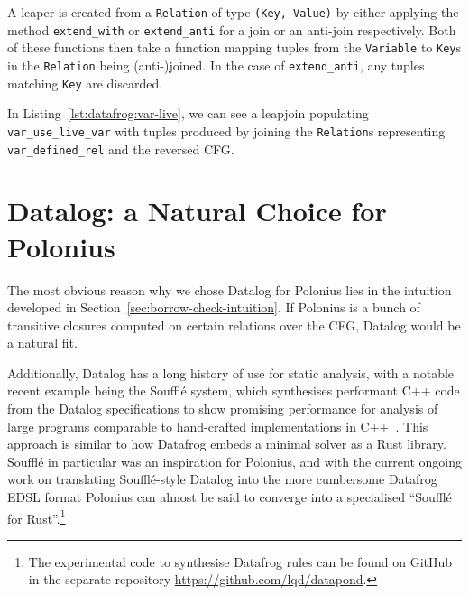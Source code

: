 \documentclass[11pt,a4paper,twoside,openany,draft]{report}
\newcommand{\InRust}[1]{\texttt{#1}}
\begin{document}
A leaper is created from a \InRust{Relation} of type \InRust{(Key, Value)} by
either applying the method \InRust{extend_with} or \InRust{extend_anti} for a
join or an anti-join respectively. Both of these functions then take a function
mapping tuples from the \InRust{Variable} to \InRust{Key}s in the
\InRust{Relation} being (anti-)joined. In the case of \InRust{extend_anti}, any
tuples matching \InRust{Key} are discarded.

In Listing~\ref{lst:datafrog:var-live}, we can see a leapjoin populating
\InRust{var_use_live_var} with tuples produced by joining the \InRust{Relation}s
representing \InRust{var_defined_rel} and the reversed CFG\@.

\section{Datalog: a Natural Choice for Polonius}\label{sec:why-datalog}

The most obvious reason why we chose Datalog for Polonius lies in the intuition
developed in Section~\ref{sec:borrow-check-intuition}. If Polonius is a bunch of
transitive closures computed on certain relations over the CFG, Datalog would be
a natural fit.

Additionally, Datalog has a long history of use for static analysis, with a
notable recent example being the Souffl{\'e} system, which synthesises
performant C++ code from the Datalog specifications to show promising
performance for analysis of large programs comparable to hand-crafted
implementations in C++~\cite{scholz_fast_2016}. This approach is similar to how
Datafrog embeds a minimal solver as a Rust library. Souffl{\'e} in particular
was an inspiration for Polonius, and with the current ongoing work on
translating Souffl{\'e}-style Datalog into the more cumbersome Datafrog EDSL
format Polonius can almost be said to converge into a specialised ``Souffl{\'e}
for Rust''.\footnote{The experimental code to synthesise Datafrog rules can be
  found on GitHub in the separate repository
  \url{https://github.com/lqd/datapond}.}
\end{document}
